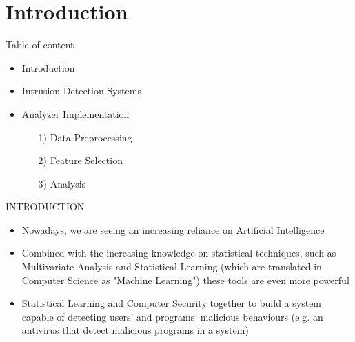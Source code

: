 \footnotesize

\section{Introduction}

	\begin{frame}{Table of content}
	
	\begin{itemize}
		\item Introduction
		\vspace{0.3cm}
		\item Intrusion Detection Systems
		\item Analyzer Implementation
		\begin{itemize}
			\item[1)] Data Preprocessing
			\item[2)] Feature Selection
			\item[3)] Analysis
		\end{itemize}			
	\end{itemize}
	
	\end{frame}

	\begin{frame}
		\begin{center}
			\begin{Huge}
				INTRODUCTION
			\end{Huge}
		\end{center}
	\end{frame}
	
	\begin{frame}
		\begin{itemize}
			\item Nowadays, we are seeing an increasing reliance on Artificial Intelligence
			\vspace{0.3cm}
			\item Combined with the increasing knowledge on statistical techniques, such as Multivariate Analysis and Statistical Learning (which are translated in Computer Science as "Machine Learning") these tools are even more powerful
			\vspace{0.3cm}
			\item Statistical Learning and Computer Security together to build a system capable of detecting users' and programs' malicious behaviours (e.g. an antivirus that detect malicious programs in a system)
		\end{itemize}
	\end{frame}
	

